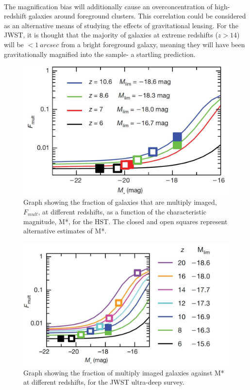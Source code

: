 \documentclass [a4paper, 12pt] {article}
\begin{document}
\\
\newline
The magnification bias will additionally cause an overconcentration of high-redshift galaxies around foreground clusters. This correlation could be considered as an alternative means of studying the effects of gravitational lensing. For the JWST, it is thought that the majority of galaxies at extreme redshifts ($z>14$) will be $<1~arcsec$ from a bright foreground galaxy, meaning they will have been gravitationally magnified into the sample- a startling prediction\cite{wyithestuart2011}.

\begin{figure}
\begin{center}
\includegraphics[scale=0.5]{gravhst1.jpg}
\end{center}
\caption{Graph showing the fraction of galaxies that are multiply imaged,  $F_{mult}$, at different redshifts, as a function of the characteristic magnitude, M*, for the HST. The closed and open squares represent alternative estimates of M*.}\label{fig:gravhst1}
\end{figure}

\begin{figure}
\begin{center}
\includegraphics[scale=0.5]{gravjwst1.jpg}
\end{center}
\caption{Graph showing the fraction of multiply imaged galaxies against M* at different redshifts, for the JWST ultra-deep survey.}\label{fig:gravjwst1}
\end{figure}
\end{document}
